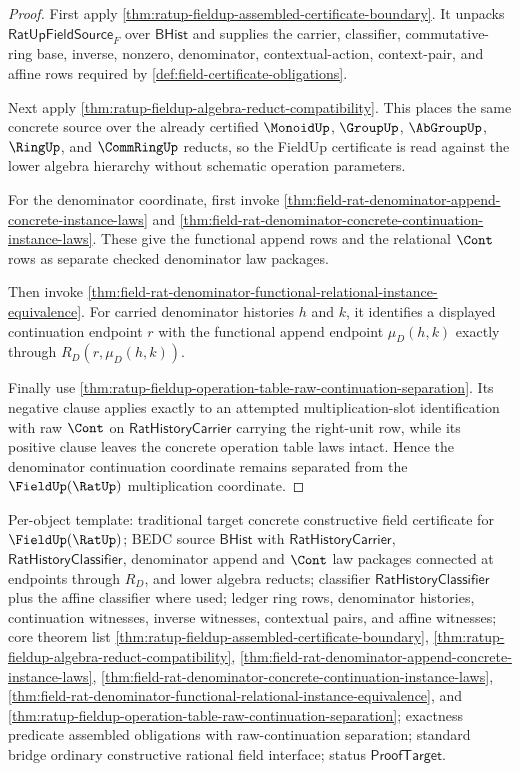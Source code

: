 \begin{proof}
First apply
\autoref{thm:ratup-fieldup-assembled-certificate-boundary}. It unpacks
$\mathsf{RatUpFieldSource}_F$ over $\mathsf{BHist}$ and supplies the carrier,
classifier, commutative-ring base, inverse, nonzero, denominator,
contextual-action, context-pair, and affine rows required by
\autoref{def:field-certificate-obligations}.

Next apply \autoref{thm:ratup-fieldup-algebra-reduct-compatibility}. This
places the same concrete source over the already certified $\MonoidUp$,
$\GroupUp$, $\AbGroupUp$, $\RingUp$, and $\CommRingUp$ reducts, so the FieldUp
certificate is read against the lower algebra hierarchy without schematic
operation parameters.

For the denominator coordinate, first invoke
\autoref{thm:field-rat-denominator-append-concrete-instance-laws} and
\autoref{thm:field-rat-denominator-concrete-continuation-instance-laws}. These
give the functional append rows and the relational $\Cont$ rows as separate
checked denominator law packages.

Then invoke
\autoref{thm:field-rat-denominator-functional-relational-instance-equivalence}.
For carried denominator histories $h$ and $k$, it identifies a displayed
continuation endpoint $r$ with the functional append endpoint $\mu_D(h,k)$
exactly through $R_D(r,\mu_D(h,k))$.

Finally use
\autoref{thm:ratup-fieldup-operation-table-raw-continuation-separation}. Its
negative clause applies exactly to an attempted multiplication-slot
identification with raw $\Cont$ on $\mathsf{RatHistoryCarrier}$ carrying the
right-unit row, while its positive clause leaves the concrete operation table
laws intact. Hence the denominator continuation coordinate remains separated
from the $\FieldUp(\RatUp)$ multiplication coordinate.
\end{proof}

Per-object template: traditional target concrete constructive field certificate
for $\FieldUp(\RatUp)$; BEDC source $\mathsf{BHist}$ with
$\mathsf{RatHistoryCarrier}$, $\mathsf{RatHistoryClassifier}$, denominator
append and $\Cont$ law packages connected at endpoints through $R_D$, and
lower algebra reducts;
classifier
$\mathsf{RatHistoryClassifier}$ plus the affine classifier where used; ledger
ring rows, denominator histories, continuation witnesses, inverse witnesses,
contextual pairs, and affine witnesses; core theorem list
\autoref{thm:ratup-fieldup-assembled-certificate-boundary},
\autoref{thm:ratup-fieldup-algebra-reduct-compatibility},
\autoref{thm:field-rat-denominator-append-concrete-instance-laws},
\autoref{thm:field-rat-denominator-concrete-continuation-instance-laws},
\autoref{thm:field-rat-denominator-functional-relational-instance-equivalence},
and \autoref{thm:ratup-fieldup-operation-table-raw-continuation-separation};
exactness predicate assembled obligations with raw-continuation separation;
standard bridge ordinary constructive rational field interface; status
$\mathsf{ProofTarget}$.


